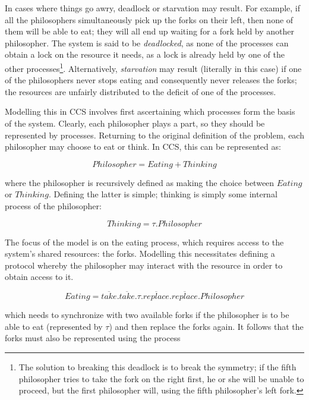 In cases where things go awry, deadlock or starvation may result.  For
example, if all the philosophers simultaneously pick up the forks on
their left, then none of them will be able to eat; they will all end
up waiting for a fork held by another philosopher.  The system is said
to be \emph{deadlocked}, as none of the processes can obtain a lock on
the resource it needs, as a lock is already held by one of the other
processes\footnote{The solution to breaking this deadlock is to break
  the symmetry; if the fifth philosopher tries to take the fork on the
  right first, he or she will be unable to proceed, but the first
  philosopher will, using the fifth philosopher's left fork.}.
Alternatively, \emph{starvation} may result (literally in this case)
if one of the philosophers never stops eating and consequently never
releases the forks; the resources are unfairly distributed to the
deficit of one of the processes.

Modelling this in CCS involves first ascertaining which processes form
the basis of the system.  Clearly, each philosopher plays a part, so
they should be represented by processes.  Returning to the original
definition of the problem, each philosopher may choose to eat or
think.  In CCS, this can be represented as:

\begin{equation}
Philosopher = Eating + Thinking
\end{equation}

\noindent where the philosopher is recursively defined as making the
choice between $Eating$ or $Thinking$.  Defining the latter is simple;
thinking is simply some internal process of the philosopher:

\begin{equation}
Thinking = \tau .Philosopher
\end{equation}

The focus of the model is on the eating process, which requires access
to the system's shared resources: the forks.  Modelling this
necessitates defining a protocol whereby the philosopher may interact
with the resource in order to obtain access to it.  

\begin{equation}
Eating = \overline{take}.\overline{take}.\tau.\overline{replace}.\overline{replace}.Philosopher
\end{equation}

\noindent which needs to synchronize with two available forks if the
philosopher is to be able to eat (represented by $\tau$) and then
replace the forks again.  It follows that the forks must also be
represented using the process

